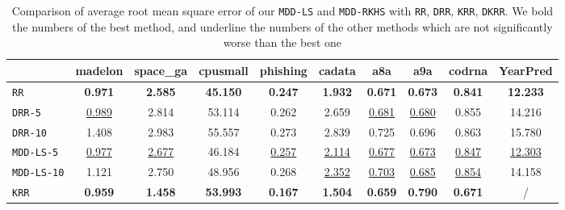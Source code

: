 \documentclass{article}
\begin{document}
\begin{table*}[t]
\small
\footnotesize
   \caption{
    \small Comparison of average root mean square error of our \texttt{MDD-LS} and \texttt{MDD-RKHS} with
    \texttt{RR}, \texttt{DRR}, \texttt{KRR}, \texttt{DKRR}.
     We bold the numbers of the best method, and underline the numbers of the other methods
    which are not significantly worse than the best one
   }
   \label{tabel:mse}
    \begin{tabular*}{\linewidth}{@{\extracolsep{-0.06cm}}lccccccccc}
    \toprule
                                &madelon                  &space\_ga               &cpusmall            &phishing           &cadata             &a8a                  &a9a                    &cod\-rna                   &YearPred                 \\   \hline
\texttt{RR}                              &\textbf{0.971}           &\textbf{2.585}          &\textbf{45.150}     &\textbf{0.247}     &\textbf{1.932}     &\textbf{0.671}       &\textbf{0.673}         &\textbf{0.841}             &\textbf{12.233} \\
\texttt{DRR-5}                           &\underline{0.989}                    &2.814                   &53.114              &0.262              &2.659              &\underline{0.681}    &\underline{0.680}      &0.855                      &14.216 \\
\texttt{DRR-10}                          &1.408                    &2.983                   &55.557              &0.273              &2.839              &0.725                &0.696                  &0.863                      &15.780 \\
\texttt{MDD-LS-5}                        &\underline{0.977}        &\underline{2.677}                   &46.184              &\underline{0.257}              &\underline{2.114}  &\underline{0.677}    &\underline{0.673}      &\underline{0.847}                      &\underline{12.303}\\
\texttt{MDD-LS-10}                       &1.121                    &2.750                   &48.956              &0.268              &\underline{2.352}              &\underline{0.703}                &\underline{0.685}                  &\underline{0.854}                      &14.158\\
\hline \hline
\texttt{KRR}                            &\textbf{0.959}           &\textbf{1.458}          &\textbf{53.993}     &\textbf{0.167}     &\textbf{1.504}     &\textbf{0.659}       &\textbf{0.790}         &\textbf{0.671}             &/ \\

\end{tabular*}
\end{table*}
\end{document}
